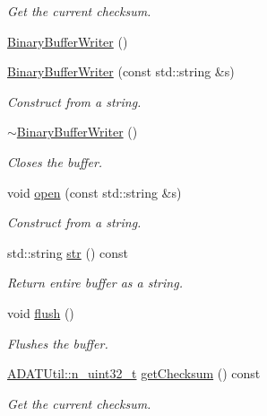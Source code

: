 \begin{DoxyCompactItemize}
\begin{DoxyCompactList}\small\item\em Get the current checksum. \end{DoxyCompactList}\item 
\mbox{\hyperlink{classADATIO_1_1BinaryBufferWriter_a3812e6b5808e6349bae019f79d78094a}{Binary\+Buffer\+Writer}} ()
\item 
\mbox{\hyperlink{classADATIO_1_1BinaryBufferWriter_acdbd4afbd1fde21aff3ad80d3c67a43c}{Binary\+Buffer\+Writer}} (const std\+::string \&s)
\begin{DoxyCompactList}\small\item\em Construct from a string. \end{DoxyCompactList}\item 
\mbox{\hyperlink{classADATIO_1_1BinaryBufferWriter_a1d17b712ef50e475fe7e4acfe6642547}{$\sim$\+Binary\+Buffer\+Writer}} ()
\begin{DoxyCompactList}\small\item\em Closes the buffer. \end{DoxyCompactList}\item 
void \mbox{\hyperlink{classADATIO_1_1BinaryBufferWriter_a394d7bf949c4def18697af392fb217a5}{open}} (const std\+::string \&s)
\begin{DoxyCompactList}\small\item\em Construct from a string. \end{DoxyCompactList}\item 
std\+::string \mbox{\hyperlink{classADATIO_1_1BinaryBufferWriter_a5c4f9b9c049173452e1cc70fe27ee188}{str}} () const
\begin{DoxyCompactList}\small\item\em Return entire buffer as a string. \end{DoxyCompactList}\item 
void \mbox{\hyperlink{classADATIO_1_1BinaryBufferWriter_accc3319508a804b054d21b6bddeef85d}{flush}} ()
\begin{DoxyCompactList}\small\item\em Flushes the buffer. \end{DoxyCompactList}\item 
\mbox{\hyperlink{namespaceADATUtil_ad945a8afa4db2d1f89b731964adae97e}{A\+D\+A\+T\+Util\+::n\+\_\+uint32\+\_\+t}} \mbox{\hyperlink{classADATIO_1_1BinaryBufferWriter_a3d7ec1583f03981f0a84571646be46f3}{get\+Checksum}} () const
\begin{DoxyCompactList}\small\item\em Get the current checksum. \end{DoxyCompactList}\end{DoxyCompactItemize}
